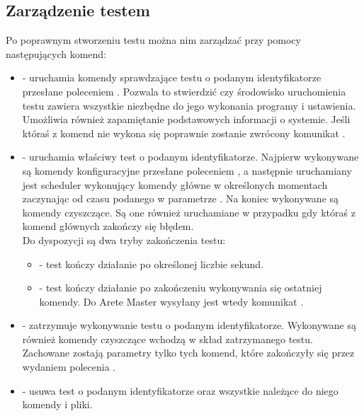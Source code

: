 \documentclass[00-praca-magisterska.tex]{subfiles}
\begin{document}
\subsection{Zarządzenie testem}

Po poprawnym stworzeniu testu można nim zarządzać przy pomocy
następujących komend:

\begin{itemize}
  \setlength{\itemsep}{10pt}

\item{ - uruchamia komendy sprawdzające
testu o podanym identyfikatorze przesłane poleceniem . Pozwala to
stwierdzić czy środowisko uruchomienia testu zawiera wszystkie niezbędne do jego
wykonania programy i ustawienia. Umożliwia również zapamiętanie podstawowych
informacji o systemie.  Jeśli któraś z komend nie wykona się poprawnie zostanie
zwrócony komunikat .}

\item{ - uruchamia właściwy test o podanym identyfikatorze. Najpierw
wykonywane są komendy konfiguracyjne przesłane poleceniem ,
a następnie uruchamiany jest scheduler wykonujący komendy główne w
określonych momentach zaczynając od czasu podanego w parametrze . Na
koniec wykonywane są komendy czyszczące. Są one również uruchamiane w przypadku
gdy któraś z komend głównych zakończy się błędem. \\

Do dyspozycji są dwa tryby zakończenia testu: \\

\begin{itemize}
  \setlength{\itemsep}{10pt}

\item{ - test kończy działanie po określonej liczbie
sekund.}

\item{ - test kończy działanie po zakończeniu wykonywania się
ostatniej komendy. Do Arete Master wysyłany jest wtedy komunikat .}

\end{itemize}}

\item{ - zatrzymuje wykonywanie testu o
podanym identyfikatorze. Wykonywane są również komendy czyszczące wchodzą w
skład zatrzymanego testu. Zachowane zostają parametry tylko tych komend, które
zakończyły się przez wydaniem polecenia .}

\item{ - usuwa test o podanym
identyfikatorze oraz wszystkie należące do niego komendy i pliki.}

\end{itemize}
\end{document}
